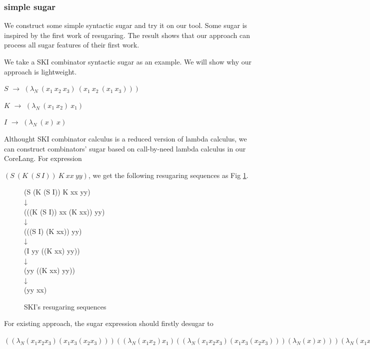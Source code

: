 \subsubsection{simple sugar}
\label{mark:simple}

We construct some simple syntactic sugar and try it on our tool. Some sugar is inspired by the first work of resugaring\cite{resugaring}. The result shows that our approach can process all sugar features of their first work.

We take a SKI combinator syntactic sugar as an example. We will show why our approach is lightweight.

\begin{flushleft}
	$S$ $\rightarrow$ $(\lambda _{N}~(x_{1}~x_{2}~x_{3})~(x_{1}~x_{2}~(x_{1}~x_{3})))$
	
	$K$ $\rightarrow$ $(\lambda _{N}~(x_{1}~x_{2})~x_{1})$
	
	$I$ $\rightarrow$ $(\lambda _{N}~(x)~x)$
\end{flushleft}

Althought SKI combinator calculus is a reduced version of lambda calculus, we can construct combinators' sugar based on call-by-need lambda calculus in our CoreLang. For expression

 $(S~(K~(S~I))~K~xx~yy)$, we get the following resugaring sequences as Fig \ref{fig:SKI}.

\begin{figure}[ht]
	\centering
	\parbox[t]{\textwidth}{
				\begin{center}
				{
					\small\selectfont
					(S (K (S I)) K xx yy)\\
					↓\\
					(((K (S I)) xx (K xx)) yy)\\
					↓\\
					(((S I) (K xx)) yy)\\
					↓\\
					(I yy ((K xx) yy))\\
					↓\\
					(yy ((K xx) yy))\\
					↓\\
					(yy xx)
				}
				\end{center}
			}
	\caption{SKI's resugaring sequences}
	\label{fig:SKI}
\end{figure}

For existing approach, the sugar expression should firstly desugar to
\begin{flushleft}
$((\lambda _{N}
   (x_{1} x_{2} x_{3})
   (x_{1} x_{3} (x_{2} x_{3})))
  ((\lambda _{N} (x_{1} x_{2}) x_{1})
   ((\lambda _{N}
     (x_{1} x_{2} x_{3})
     (x_{1} x_{3} (x_{2} x_{3})))
    (\lambda _{N} (x) x)))
  (\lambda _{N} (x_{1} x_{2}) x_{1})
  xx
  yy)$
\end{flushleft}

